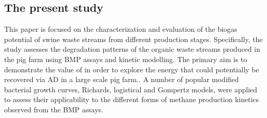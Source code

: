 \subsection{The present study}
This paper is focused on the characterization and evaluation of the biogas potential of swine waste streams from different production stages. Specifically, the study assesses the degradation patterns of the organic waste streams produced in the pig farm using BMP assays and kinetic modelling. The primary aim is to demonstrate the value of  in order to explore the energy that could potentially be recovered via AD in a large scale pig farm.. A number of popular modified bacterial growth curves, Richards, logistical and Gompertz models, were applied to assess their applicability to the different forms of methane production kinetics observed from the BMP assays.